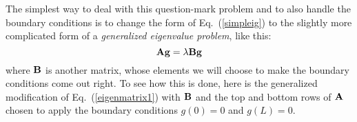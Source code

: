 
The simplest way to deal with this question-mark problem and to also
handle the boundary conditions is to change the form of
Eq.~(\ref{simpleig}) to the slightly more complicated form of a {\it
generalized eigenvalue problem}, like this:
\begin{equation}
    {\bf A g} = \lambda {\bf B g}
    \label{generaleig}
\end{equation}
where $\bf B$ is another matrix, whose elements we will choose to
make the boundary conditions come out right. To see how this is done,
here is the generalized modification of Eq.~(\ref{eigenmatrix1}) with
$\bf B$ and the top and bottom rows of $\bf A$ chosen to apply the
boundary conditions $g(0)=0$ and $g(L)=0$.
\small
